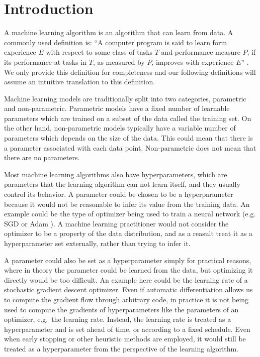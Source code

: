 \chapter{Introduction}
\label{chapter:introduction}

A machine learning algorithm is an algorithm that can learn from data. A
commonly used definition is: ``A computer program is said to learn form
experience $E$ with respect to some class of tasks $T$ and performance measure
$P$, if its performance at tasks in $T$, as measured by $P$, improves with
experience $E$'' \citep{mitchell-mldef}. We only provide this definition for
completeness and our following definitions will assume an intuitive translation
to this definition.

Machine learning models are traditionally split into two categories, parametric
and non-parametric. Parametric models have a fixed number of learnable parameters
which are trained on a subset of the data called the training set. On the other hand,
non-parametric models typically have a variable number of parameters which depends on
the size of the data. This could mean that there is a parameter associated with each
data point. Non-parametric does not mean that there are no parameters.

Most machine learning algorithms also have hyperparameters, which are
parameters that the learning algorithm can not learn itself, and they usually
control its behavior. A parameter could be chosen to be a hyperparameter
because it would not be reasonable to infer its value from the training data.
An example could be the type of optimizer being used to train a neural network
(e.g. SGD or Adam \citep{kingma2014adam}). A machine learning practitioner
would not consider the optimizer to be a property of the data distribution, and
as a reasult treat it as a hyperparameter set externally, rather than trying to
infer it.

A parameter could also be set as a hyperparameter simply for practical reasons, where in
theory the parameter could be learned from the data, but optimizing it directly
would be too difficult. An example here could be the learning rate of a
stochastic gradient descent optimizer. Even if automatic differentiation
\citep{maclaurin2015autograd} allows us to compute the gradient flow through
arbitrary code, in practice it is not being used to compute the gradients of
hyperparameters like the parameters of an optimizer, e.g.\ the learning rate.
Instead, the learning rate is treated as a hyperparameter and is set ahead of
time, or according to a fixed schedule. Even when early stopping or other
heuristic methods are employed, it would still be treated as a hyperparameter
from the perspective of the learning algorithm.

